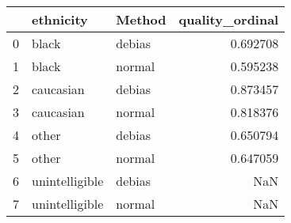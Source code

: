 \begin{tabular}{lllr}
\toprule
 & ethnicity & Method & quality_ordinal \\
\midrule
0 & black & debias & 0.692708 \\
1 & black & normal & 0.595238 \\
2 & caucasian & debias & 0.873457 \\
3 & caucasian & normal & 0.818376 \\
4 & other & debias & 0.650794 \\
5 & other & normal & 0.647059 \\
6 & unintelligible & debias & NaN \\
7 & unintelligible & normal & NaN \\
\bottomrule
\end{tabular}

